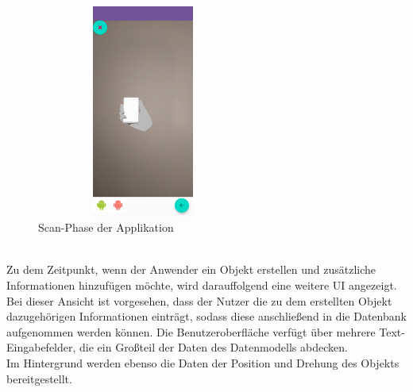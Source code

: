 \begin{figure}[hbt!]
    \centering
    \includegraphics[width=7cm,height=7cm,keepaspectratio]{4Umsetzung/Bilder/scan-phase.jpg}
    \caption{Scan-Phase der Applikation}
    \label{pic:scan}
\end{figure}
\pagebreak
\\ %
Zu dem Zeitpunkt, wenn der Anwender ein Objekt erstellen und zusätzliche Informationen hinzufügen möchte, wird darauffolgend eine weitere \acs{UI} 
angezeigt. Bei dieser Ansicht ist vorgesehen, dass der Nutzer die zu dem erstellten Objekt dazugehörigen Informationen einträgt, sodass diese anschließend 
in die Datenbank aufgenommen werden können. Die Benutzeroberfläche verfügt über mehrere Text-Eingabefelder, die ein Großteil der Daten des Datenmodells 
abdecken. %
\\ 
Im Hintergrund werden ebenso die Daten der Position und Drehung des 
Objekts bereitgestellt.%
